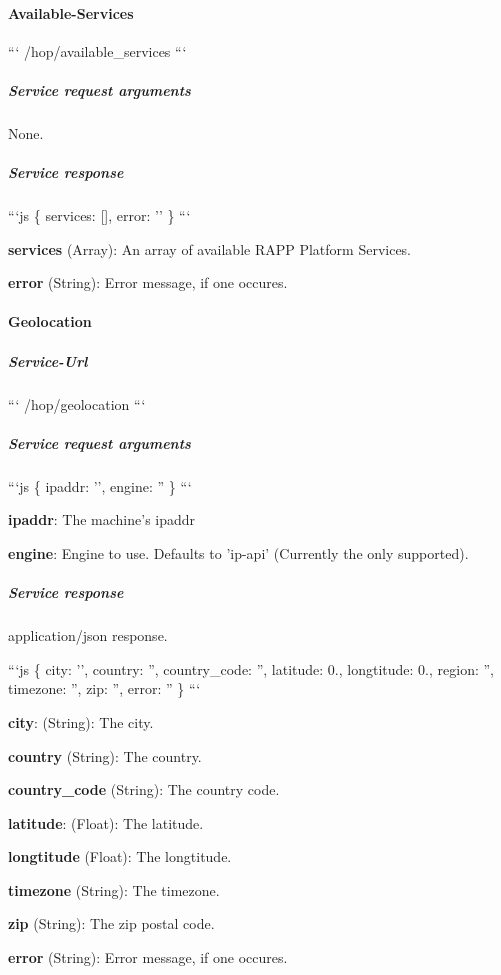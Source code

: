 \paragraph*{Available-\/\-Services}

``` /hop/available\-\_\-services ```

\subparagraph*{Service request arguments}

None.

\subparagraph*{Service response}

```js \{ services\-: \mbox{[}\mbox{]}, error\-: '' \} ```


\begin{DoxyItemize}
\item {\bfseries services} (Array)\-: An array of available R\-A\-P\-P Platform Services.
\item {\bfseries error} (String)\-: Error message, if one occures.
\end{DoxyItemize}

\paragraph*{Geolocation}

\subparagraph*{Service-\/\-Url}

``` /hop/geolocation ```

\subparagraph*{Service request arguments}

```js \{ ipaddr\-: '', engine\-: '' \} ```


\begin{DoxyItemize}
\item {\bfseries ipaddr}\-: The machine's ipaddr
\item {\bfseries engine}\-: Engine to use. Defaults to 'ip-\/api' (Currently the only supported).
\end{DoxyItemize}

\subparagraph*{Service response}

application/json response.

```js \{ city\-: '', country\-: '', country\-\_\-code\-: '', latitude\-: 0., longtitude\-: 0., region\-: '', timezone\-: '', zip\-: '', error\-: '' \} ```


\begin{DoxyItemize}
\item {\bfseries city}\-: (String)\-: The city.
\item {\bfseries country} (String)\-: The country.
\item {\bfseries country\-\_\-code} (String)\-: The country code.
\item {\bfseries latitude}\-: (Float)\-: The latitude.
\item {\bfseries longtitude} (Float)\-: The longtitude.
\item {\bfseries timezone} (String)\-: The timezone.
\item {\bfseries zip} (String)\-: The zip postal code.
\item {\bfseries error} (String)\-: Error message, if one occures.
\end{DoxyItemize}

